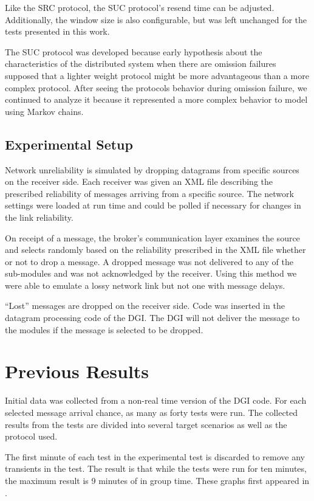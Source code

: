 Like the SRC protocol, the SUC protocol's resend time can be adjusted. 
Additionally, the window size is also configurable, but was left unchanged for 
the tests presented in this work.

The SUC protocol was developed because early hypothesis about the
characteristics of the distributed system when there are omission failures
supposed that a lighter weight protocol might be more advantageous than a more
complex protocol. After seeing the protocols behavior during omission failure,
we continued to analyze it because it represented a more complex behavior to
model using Markov chains.

\subsection{Experimental Setup}
Network unreliability is simulated by dropping datagrams from specific sources
on the receiver side. Each receiver was given an XML file describing the
prescribed reliability of messages arriving from a specific source. The
network settings were loaded at run time and could be polled if necessary for
changes in the link reliability.

On receipt of a message, the broker's communication layer examines the source
and selects randomly based on the reliability prescribed in the XML file whether
or not to drop a message. A dropped message was not delivered to any of the
sub-modules and was not acknowledged by the receiver. Using this method we were 
able to emulate a lossy network link but not one with message delays.

``Lost'' messages are dropped on the receiver side. Code was inserted in the
datagram processing code of the DGI. The DGI will not deliver the message to
the modules if the message is selected to be dropped.

\section{Previous Results}
Initial data was collected from a non-real time version of the DGI code.
For each selected message arrival chance, as many as forty tests were run.
The collected results from the tests are divided into several target scenarios
as well as the protocol used.

The first minute of each test in the experimental test is discarded to remove
any transients in the test. The result is that while the tests were run for
ten minutes, the maximum result is 9 minutes of in group time. These graphs
first appeared in \cite{CRITIS2012}.

